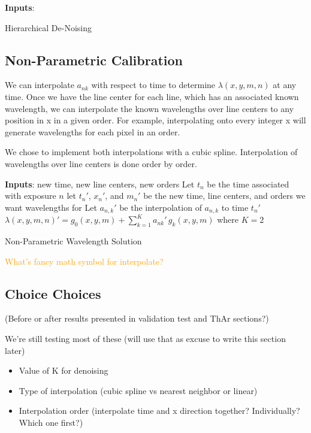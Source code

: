 \documentclass[12pt, letterpaper]{article}
\newcommand{\lz}[1]{\textcolor{orange}{#1}}
\begin{document}
\begin{algorithm}
\SetAlgoLined
\textbf{Inputs}: \;
\caption{Hierarchical De-Noising}
\end{algorithm}

\subsection{Non-Parametric Calibration} \label{sec:nonparam}
We can interpolate $a_{nk}$ with respect to time to determine $\lambda(x,y,m,n)$ at any time.  Once we have the line center for each line, which has an associated known wavelength, we can interpolate the known wavelengths over line centers to any position in x in a given order.  For example, interpolating onto every integer x will generate wavelengths for each pixel in an order.

We chose to implement both interpolations with a cubic spline.  Interpolation of wavelengths over line centers is done order by order.

\begin{algorithm}
\SetAlgoLined
\textbf{Inputs}: new time, new line centers, new orders\; %
Let $t_n$ be the time associated with exposure $n$\;
let $t_n'$, $x_n'$, and $m_n'$ be the new time, line centers, and orders we want wavelengths for\;
Let $a_{n,k}'$ be the interpolation of $a_{n,k}$ to time $t_n'$\;
$\lambda(x,y,m,n)' = g_0(x,y,m) + \sum_{k=1}^K a_{nk}'\,g_k(x,y,m)$ where $K=2$\;
\caption{Non-Parametric Wavelength Solution}
\end{algorithm}
\lz{What's fancy math symbol for interpolate?}

\subsection{Choice Choices} \label{sec:choices}
(Before or after results presented in validation test and ThAr sections?)

We're still testing most of these (will use that as excuse to write this section later)
\begin{itemize}
	\item Value of K for denoising
	\item Type of interpolation (cubic spline vs nearest neighbor or linear)
	\item Interpolation order (interpolate time and x direction together?  Individually?  Which one first?)
\end{itemize}
\end{document}

